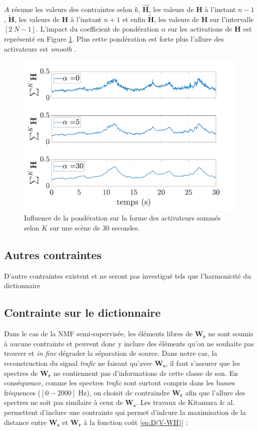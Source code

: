 $A$ résume les valeurs des contraintes selon $k$, $\overrightarrow{\mathbf{H}}$, les valeurs de $\mathbf{H}$ à l'instant $n-1$, $\overleftarrow{\mathbf{H}}$, les valeurs de $\mathbf{H}$ à l'instant $n+1$ et enfin $\overleftrightarrow{\mathbf{H}}$, les valeurs de $\mathbf{H}$ sur l'intervalle $\left[2~N-1 \right]$. L'impact du coefficient de pondération $\alpha$ sur les activations de $\mathbf{H}$ est représenté en Figure \ref{fig:smoothnessExample}. Plus cette pondération est forte plus l'allure des activateurs est \textit{smooth} .

\begin{figure}[hbtp]
\centering
\includegraphics[width=0.7\linewidth]{images/NMF/smoothness_02.pdf}
\caption{Influence de la pondération sur la forme des activateurs sommés selon $K$ sur une scène de 30 secondes.}
\label{fig:smoothnessExample}
\end{figure}

\subsection{Autres contraintes}

D'autre contraintes existent et ne seront pas investigué tels que l'harmonicité du dictionnaire


\subsection{Contrainte sur le dictionnaire}

Dans le cas de la NMF semi-supervisée, les éléments libres de $\mathbf{W_r}$ ne sont soumis à aucune contrainte et peuvent donc y inclure des éléments qu'on ne souhaite pas trouver et \textit{in fine} dégrader la séparation de source. Dans notre cas, la reconstruction du signal \textit{trafic} ne faisant qu'avec $\mathbf{W_s}$, il faut s'assurer que les spectres de $\mathbf{W_r}$ ne contiennent pas d'informations de cette classe de son. En conséquence, comme les spectres \textit{trafic} sont surtout compris dans les basses fréquences ($\left[0-2000 \right]$ Hz), on choisit  de contraindre $\mathbf{W_r}$ afin que l'allure des spectres ne soit pas similaire à ceux de $\mathbf{W_s}$. Les travaux de Kitamura $\&$ al. \cite{kitamura} permettent d'inclure une contrainte qui permet d'inlcure la maximisation de la distance entre $\mathbf{W_s}$ et $\mathbf{W_r}$ à la fonction coût \ref{eq:D(V-WH)} : 

